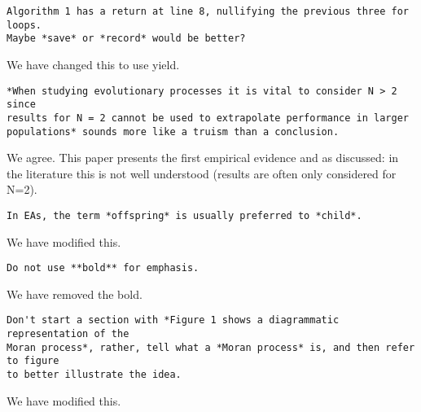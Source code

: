 \documentclass[a4]{article}
\begin{document}
\begin{verbatim}
Algorithm 1 has a return at line 8, nullifying the previous three for loops.
Maybe *save* or *record* would be better?
\end{verbatim}

We have changed this to use yield.

\begin{verbatim}
*When studying evolutionary processes it is vital to consider N > 2 since
results for N = 2 cannot be used to extrapolate performance in larger
populations* sounds more like a truism than a conclusion.
\end{verbatim}

We agree. This paper presents the first empirical evidence and as discussed: in
the literature this is not well understood (results are often only considered
for N=2).

\begin{verbatim}
In EAs, the term *offspring* is usually preferred to *child*.
\end{verbatim}

We have modified this.

\begin{verbatim}
Do not use **bold** for emphasis.
\end{verbatim}

We have removed the bold.

\begin{verbatim}
Don't start a section with *Figure 1 shows a diagrammatic representation of the
Moran process*, rather, tell what a *Moran process* is, and then refer to figure
to better illustrate the idea.
\end{verbatim}

We have modified this.
\end{document}
